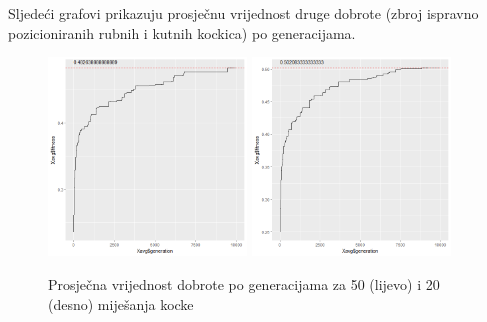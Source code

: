 \documentclass[times, utf8, seminar, numeric]{fer}
\begin{document}
Sljedeći grafovi prikazuju prosječnu vrijednost druge dobrote (zbroj ispravno pozicioniranih rubnih i kutnih kockica) po generacijama.

  		\begin{figure}[h]
			\centering
			\includegraphics[width=0.47\textwidth]{../results/cubies_fitness/50_scrambles/cross0,5greedy10mut20.png}
			\includegraphics[width=0.47\textwidth]{../results/cubies_fitness/20_scrambles/cross0,5greedy10mut20.png}
			\caption{Prosječna vrijednost dobrote po generacijama za 50 (lijevo) i 20 (desno) miješanja kocke }
		\end{figure}
\end{document}
